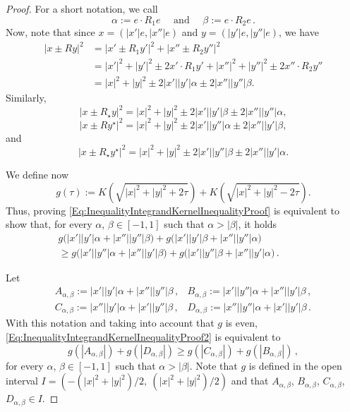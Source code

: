 \documentclass[12pt,reqno]{amsart}
\theoremstyle{definition}
\theoremstyle{remark}
\newcommand{\bpar}[1]{\left ( {#1}\right )}
\numberwithin{equation}{section}
\begin{document}
\begin{proof}
	
	For a short notation, we call
	\begin{equation}
	\label{Eq:DefAlphaBeta}
	\alpha := e \cdot R_1 e  \quad \text{ and } \quad \beta := e \cdot R_2 e\,.
	\end{equation}
	Now, note that since  $x = (|x'|e, |x''|e)$ and $y = (|y'|e, |y''|e)$, we have
	\begin{align*}
	|x \pm Ry|^2&= |x' \pm R_1y'|^2 + |x'' \pm R_2y''|^2 \\
	&= |x'|^2 + |y'|^2 \pm 2 x'\cdot R_1 y' +  |x''|^2 + |y''|^2 \pm 2 x''\cdot R_2 y''\\
	&= |x|^2 + |y|^2 \pm 2 |x'||y'| \alpha \pm 2 |x''||y''| \beta.
	\end{align*}
	Similarly,
	$$
	|x \pm R_\star y|^2 =  |x|^2 + |y|^2 \pm 2 |x'||y'| \beta \pm 2 |x''||y''|\alpha,
	$$
	$$
	|x \pm R y^\star|^2 =  |x|^2 + |y|^2 \pm 2 |x'||y''| \alpha \pm 2 |x''||y'|\beta,
	$$
	and
	$$
	|x \pm R_\star y^\star|^2 = |x|^2 + |y|^2 \pm 2 |x'||y''| \beta \pm 2 |x''||y'| \alpha.
	$$
	
	We define now
	$$
	g(\tau) := K \bpar{\sqrt{|x|^2 + |y|^2 + 2 \tau }} + K \bpar{\sqrt{|x|^2 + |y|^2 - 2 \tau}}.
	$$
	Thus, proving \eqref{Eq:InequalityIntegrandKernelInequalityProof} is equivalent to show that, for every $\alpha$, $\beta \in [-1,1]$ such that $\alpha > |\beta|$, it holds
	\begin{equation}
	\label{Eq:InequalityIntegrandKernelInequalityProof2}
	\begin{split}
	g\Big(|x'||y'| \alpha + |x''||y''| \beta \Big)
	+ g\Big(|x'||y'| \beta + |x''||y''| \alpha \Big) \hspace{2cm}
	\\ \geq
	g\Big(|x'||y''| \alpha + |x''||y'|\beta \Big)
	+ g\Big(|x'||y''| \beta + |x''||y'| \alpha \Big)\,.
	\end{split}
	\end{equation}
	
	Let
	$$
	\begin{array}{cc}
	A_{\alpha,\beta} := |x'||y'|  \alpha + |x''||y''|\beta \,, &
	B_{\alpha,\beta} := |x'||y''| \alpha + |x''||y'| \beta \,, \\
	C_{\alpha,\beta} := |x''||y'| \alpha + |x'||y''| \beta \,, &
	D_{\alpha,\beta} := |x''||y''|\alpha + |x'||y'|  \beta \,.
	\end{array}
	$$
	With this notation and taking into account that $g$ is even,
	\eqref{Eq:InequalityIntegrandKernelInequalityProof2} is equivalent to
	\begin{equation}
	\label{Eq:InequalityIntegrandKernelInequalityProof3}
	g(|A_{\alpha,\beta}|) + g(|D_{\alpha,\beta}|) \geq g(|C_{\alpha,\beta}|) + g(|B_{\alpha,\beta}|)\,,
	\end{equation}
	for every $\alpha$, $\beta \in [-1,1]$ such that $\alpha > |\beta|$. Note that $g$ is defined in the open interval $I = (-(|x|^2 + |y|^2)/2,\ (|x|^2 + |y|^2)/2)$ and that $A_{\alpha,\beta}$, $B_{\alpha,\beta}$, $C_{\alpha,\beta}$, $D_{\alpha,\beta} \in I$.
	

\end{proof}
\end{document}
